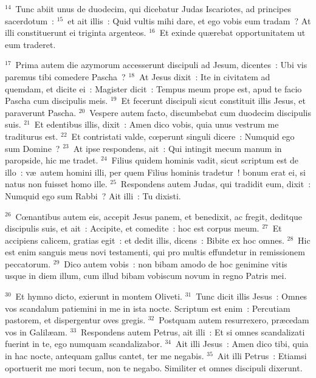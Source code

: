 ${}^{14}$~Tunc abiit unus de duodecim, qui dicebatur Judas Iscariotes, ad principes sacerdotum~:
${}^{15}$~et ait illis~: Quid vultis mihi dare, et ego vobis eum tradam~? At illi constituerunt ei triginta argenteos.
${}^{16}$~Et exinde qu\ae rebat opportunitatem ut eum traderet.


${}^{17}$~Prima autem die azymorum accesserunt discipuli ad Jesum, dicentes~: Ubi vis paremus tibi comedere Pascha~?
${}^{18}$~At Jesus dixit~: Ite in civitatem ad quemdam, et dicite ei~: Magister dicit~: Tempus meum prope est, apud te facio Pascha cum discipulis meis.
${}^{19}$~Et fecerunt discipuli sicut constituit illis Jesus, et paraverunt Pascha.
${}^{20}$~Vespere autem facto, discumbebat cum duodecim discipulis suis.
${}^{21}$~Et edentibus illis, dixit~: Amen dico vobis, quia unus vestrum me traditurus est.
${}^{22}$~Et contristati valde, cœperunt singuli dicere~: Numquid ego sum Domine~?
${}^{23}$~At ipse respondens, ait~: Qui intingit mecum manum in paropside, hic me tradet.
${}^{24}$~Filius quidem hominis vadit, sicut scriptum est de illo~: v\ae\ autem homini illi, per quem Filius hominis tradetur~! bonum erat ei, si natus non fuisset homo ille.
${}^{25}$~Respondens autem Judas, qui tradidit eum, dixit~: Numquid ego sum Rabbi~? Ait illi~: Tu dixisti.


${}^{26}$~Cœnantibus autem eis, accepit Jesus panem, et benedixit, ac fregit, deditque discipulis suis, et ait~: Accipite, et comedite~: hoc est corpus meum.
${}^{27}$~Et accipiens calicem, gratias egit~: et dedit illis, dicens~: Bibite ex hoc omnes.
${}^{28}$~Hic est enim sanguis meus novi testamenti, qui pro multis effundetur in remissionem peccatorum.
${}^{29}$~Dico autem vobis~: non bibam amodo de hoc genimine vitis usque in diem illum, cum illud bibam vobiscum novum in regno Patris mei.


${}^{30}$~Et hymno dicto, exierunt in montem Oliveti.
${}^{31}$~Tunc dicit illis Jesus~: Omnes vos scandalum patiemini in me in ista nocte. Scriptum est enim~: Percutiam pastorem, et dispergentur oves gregis.
${}^{32}$~Postquam autem resurrexero, pr\ae cedam vos in Galil\ae am.
${}^{33}$~Respondens autem Petrus, ait illi~: Et si omnes scandalizati fuerint in te, ego numquam scandalizabor.
${}^{34}$~Ait illi Jesus~: Amen dico tibi, quia in hac nocte, antequam gallus cantet, ter me negabis.
${}^{35}$~Ait illi Petrus~: Etiamsi oportuerit me mori tecum, non te negabo. Similiter et omnes discipuli dixerunt.


